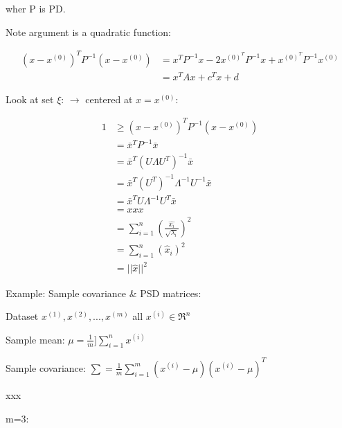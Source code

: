 wher P is PD.

Note argument is a quadratic function:

\begin{align*}
(x - x^{(0)})^TP^{-1}(x - x^{(0)}) &= x^TP^{-1}x - 2x^{(0)^T}P^{-1}x + x^{(0)^T}P^{-1}x^{(0)}\\
&= x^TAx + c^Tx + d
\end{align*}

Look at set $\xi$: $\rightarrow$ centered at $x = x^{(0)}$:

\begin{align*}
1 &\geq (x - x^{(0)})^TP^{-1}(x - x^{(0)})\\
&= \bar{x}^TP^{-1}\bar{x}\\
&= \bar{x}^T(U\Lambda U^T)^{-1}\bar{x}\\
&= \bar{x}^T(U^T)^{-1}\Lambda^{-1}U^{-1}\bar{x}\\
&= \bar{x}^TU\Lambda^{-1}U^T\bar{x}\\
&= xxx\\
&= \sum^n_{i=1}(\frac{\hat{x_i}}{\sqrt{\lambda_i}})^2\\
&= \sum^n_{i=1}(\hat{x}_i)^2\\
&= ||\hat{x}||^2
\end{align*}

\begin{figure}
	\centering
	\resizebox{7.5cm}{3cm}{}
	\caption{}
	\label{}
\end{figure}


Example: Sample covariance \& PSD matrices: 

Dataset $x^{(1)}, x^{(2)}, ..., x^{(m)}$ all $x^{(i)}\in \Re^n$

Sample mean: $\mu = \frac{1}{m}]\sum^n_{i=1}x^{(i)}$

Sample covariance: $\sum = \frac{1}{m}\sum^m_{i=1}(x^{(i)}-\mu)(x^{(i)}-\mu)^T$

xxx

m=3:

